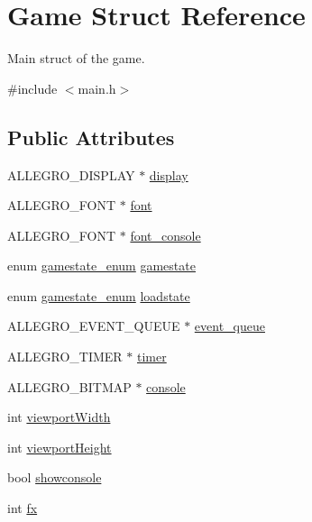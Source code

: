 \hypertarget{structGame}{\section{Game Struct Reference}
\label{structGame}
}


Main struct of the game.  




{\ttfamily \#include $<$main.\-h$>$}

\subsection*{Public Attributes}
\begin{DoxyCompactItemize}
\item 
A\-L\-L\-E\-G\-R\-O\-\_\-\-D\-I\-S\-P\-L\-A\-Y $\ast$ \hyperlink{structGame_a2bf8ece79fe05b03c31f2e2ede42e5f5}{display}
\item 
A\-L\-L\-E\-G\-R\-O\-\_\-\-F\-O\-N\-T $\ast$ \hyperlink{structGame_a455bfdaacd5f2bda80b640c02ec3250e}{font}
\item 
A\-L\-L\-E\-G\-R\-O\-\_\-\-F\-O\-N\-T $\ast$ \hyperlink{structGame_a692f2c3ec0f3e956aa8bdac00a864bf8}{font\-\_\-console}
\item 
enum \hyperlink{main_8h_ae1e9f94402d151ae1adc212237a6d153}{gamestate\-\_\-enum} \hyperlink{structGame_a5118a01ee6bb74fb41e8e8880a5b85a2}{gamestate}
\item 
enum \hyperlink{main_8h_ae1e9f94402d151ae1adc212237a6d153}{gamestate\-\_\-enum} \hyperlink{structGame_a026bb8ebb6454c0d87dea503eafa9197}{loadstate}
\item 
A\-L\-L\-E\-G\-R\-O\-\_\-\-E\-V\-E\-N\-T\-\_\-\-Q\-U\-E\-U\-E $\ast$ \hyperlink{structGame_a820782e408ff7a704dc12af67eb0c44f}{event\-\_\-queue}
\item 
A\-L\-L\-E\-G\-R\-O\-\_\-\-T\-I\-M\-E\-R $\ast$ \hyperlink{structGame_a8d6d4f06c6412d085112cd007977d868}{timer}
\item 
A\-L\-L\-E\-G\-R\-O\-\_\-\-B\-I\-T\-M\-A\-P $\ast$ \hyperlink{structGame_aa2e3d0922374dc870a1aeabf9e3b8ae2}{console}
\item 
int \hyperlink{structGame_aea50dd6aa55c0d5bbd42dcb38e433a71}{viewport\-Width}
\item 
int \hyperlink{structGame_a3e8d2e824fc4de63e936c4b0bcf071f3}{viewport\-Height}
\item 
bool \hyperlink{structGame_ab1dafa4ce0c3526439418ac24bf616d8}{showconsole}
\item 
int \hyperlink{structGame_a10c0e81918f42e7367b4590e6885048e}{fx}

\end{DoxyCompactItemize}

